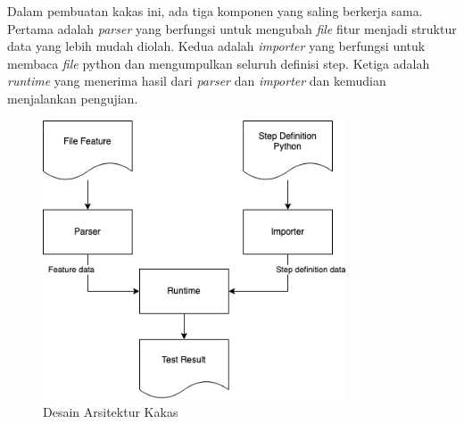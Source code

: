 Dalam pembuatan kakas ini, ada tiga komponen yang saling berkerja sama. Pertama adalah \emph{parser} yang
berfungsi untuk mengubah \emph{file} fitur menjadi struktur data yang lebih mudah diolah. Kedua adalah
\emph{importer} yang berfungsi untuk membaca \emph{file} python dan mengumpulkan seluruh definisi step.
Ketiga adalah \emph{runtime} yang menerima hasil dari \emph{parser} dan \emph{importer} dan kemudian
menjalankan pengujian.

\begin{figure}[h]
  \centering
  \includegraphics[width=0.8\textwidth]{resources/desain-arsitektur.png}
  \caption{Desain Arsitektur Kakas}
\end{figure}








